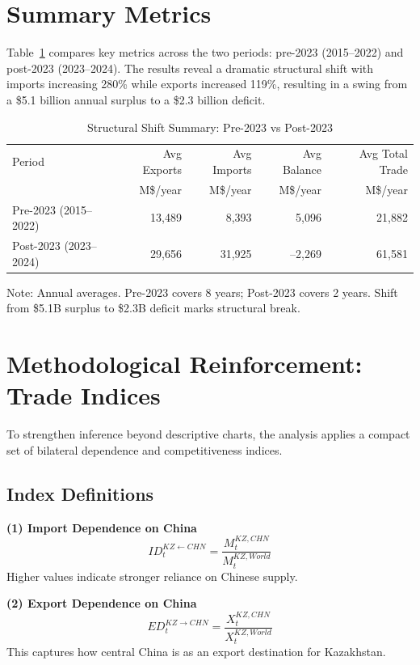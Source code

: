 \documentclass[12pt]{article}
\begin{document}
\section{Summary Metrics}

Table~\ref{tab:summary} compares key metrics across the two periods: pre-2023 (2015--2022) and post-2023 (2023--2024). The results reveal a dramatic structural shift with imports increasing 280\% while exports increased 119\%, resulting in a swing from a \$5.1 billion annual surplus to a \$2.3 billion deficit.

\begin{table}[H]
\centering
\small
\caption{Structural Shift Summary: Pre-2023 vs Post-2023}
\label{tab:summary}
\begin{tabular}{lrrrr}
\toprule
Period & Avg Exports & Avg Imports & Avg Balance & Avg Total Trade \\
 & M\$/year & M\$/year & M\$/year & M\$/year \\
\midrule
Pre-2023 (2015--2022) & 13,489 & 8,393 & 5,096 & 21,882 \\
Post-2023 (2023--2024) & 29,656 & 31,925 & --2,269 & 61,581 \\
\bottomrule
\end{tabular}
\footnotesize
Note: Annual averages. Pre-2023 covers 8 years; Post-2023 covers 2 years. Shift from \$5.1B surplus to \$2.3B deficit marks structural break.
\end{table}

\section{Methodological Reinforcement: Trade Indices}

To strengthen inference beyond descriptive charts, the analysis applies a compact set of bilateral dependence and competitiveness indices.

\subsection*{Index Definitions}

\textbf{(1) Import Dependence on China}
\[
ID_t^{KZ \leftarrow CHN} = \frac{M_t^{KZ,CHN}}{M_t^{KZ,World}}
\]
Higher values indicate stronger reliance on Chinese supply.

\textbf{(2) Export Dependence on China}
\[
ED_t^{KZ \rightarrow CHN} = \frac{X_t^{KZ,CHN}}{X_t^{KZ,World}}
\]
This captures how central China is as an export destination for Kazakhstan.
\end{document}
